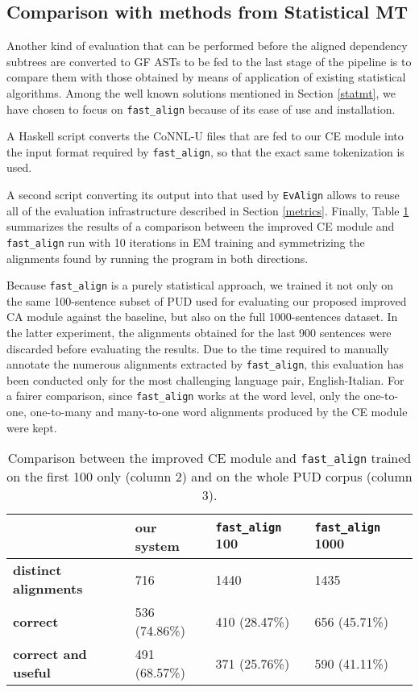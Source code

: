 \subsection{Comparison with methods from Statistical MT}
Another kind of evaluation that can be performed before the aligned dependency subtrees are converted to GF ASTs to be fed to the last stage of the pipeline is to compare them with those obtained by means of application of existing statistical algorithms. Among the well known solutions mentioned in Section \ref{statmt}, we have chosen to focus on \texttt{fast\_align} \cite{fast} because of its ease of use and installation. \smallskip

A Haskell script converts the CoNNL-U files that are fed to our CE module into the input format required by \texttt{fast\_align}, so that the exact same tokenization is used. \smallskip

A second script converting its output into that used by \texttt{EvAlign} allows to reuse all of the evaluation infrastructure described in Section \ref{metrics}.
Finally, Table \ref{tfast} summarizes the results of a comparison between the improved CE module and \texttt{fast\_align} run with 10 iterations in EM training and symmetrizing the alignments found by running the program in both directions. \smallskip 

Because \texttt{fast\_align} is a purely statistical approach, we trained it not only on the same 100-sentence subset of PUD used for evaluating our proposed improved CA module against the baseline, but also on the full 1000-sentences dataset. 
In the latter experiment, the alignments obtained for the last 900 sentences were discarded before evaluating the results.
Due to the time required to manually annotate the numerous alignments extracted by \texttt{fast\_align}, this evaluation has been conducted only for the most challenging language pair, English-Italian. 
For a fairer comparison, since \texttt{fast\_align} works at the word level, only the one-to-one, one-to-many and many-to-one word alignments produced by the CE module were kept.

\begin{table}[H]
 \centering
 \small
 \begin{tabular}{|l|l|l|l|}
 \hline
  & \textbf{our system} & \textbf{\texttt{fast\_align} 100} & \textbf{\texttt{fast\_align} 1000}\\ \hline
  \textbf{distinct alignments} & 716 & 1440 & 1435 \\ \hline
  \textbf{correct} & 536 (74.86\%) & 410 (28.47\%) & 656 (45.71\%)\\ \hline
  \textbf{correct and useful} & 491 (68.57\%) & 371 (25.76\%) & 590 (41.11\%)\\ \hline
 \end{tabular}
 \caption[Comparison between the improved CE module and \texttt{fast\_align}]{Comparison between the improved CE module and \texttt{fast\_align} trained on the first 100 only (column 2) and on the whole PUD corpus (column 3).}
 \label{tfast}
\end{table}

